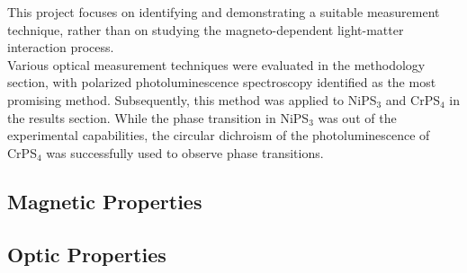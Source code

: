 \documentclass[
	twoside,
	parskip=half,
	a4paper,
]{scrbook}
\begin{document}
This project focuses on identifying and demonstrating a suitable measurement technique, rather than on studying the magneto-dependent light-matter interaction process.\\
Various optical measurement techniques were evaluated in the methodology section, with polarized photoluminescence spectroscopy identified as the most promising method.
Subsequently, this method was applied to NiPS$_3$ and CrPS$_4$ in the results section.
While the phase transition in NiPS$_3$ was out of the experimental capabilities, the circular dichroism of the photoluminescence of CrPS$_4$ was successfully used to observe phase transitions.


\subsection*{Magnetic Properties}

\subsection*{Optic Properties}



\end{document}
